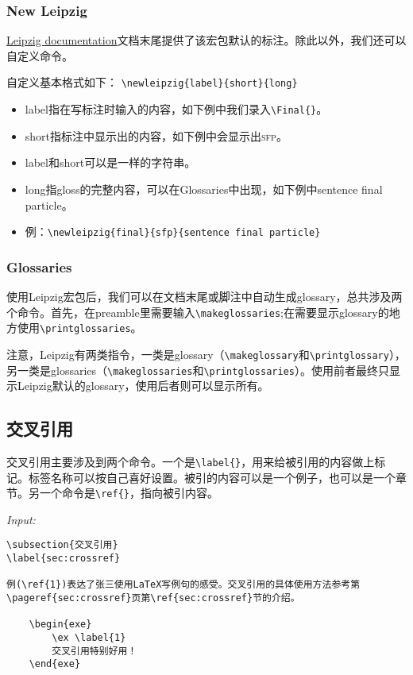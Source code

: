 \documentclass[a4paper,12pt]{article}
\begin{document}
\subsubsection{New Leipzig}

\href{http://ctan.cs.uu.nl/macros/latex/contrib/leipzig/leipzig.pdf}{Leipzig documentation}文档末尾提供了该宏包默认的标注。除此以外，我们还可以自定义命令。

\vspace{3mm}
自定义基本格式如下：
\verb|\newleipzig{label}{short}{long}|
\begin{itemize}
	\item label指在写标注时输入的内容，如下例中我们录入\verb|\Final{}|。
	\item short指标注中显示出的内容，如下例中会显示出\textsc{sfp}。
	\item label和short可以是一样的字符串。
	\item long指gloss的完整内容，可以在Glossaries中出现，如下例中sentence final particle。
	\item 例：\verb|\newleipzig{final}{sfp}{sentence final particle}|
\end{itemize}

\subsubsection{Glossaries}

使用Leipzig宏包后，我们可以在文档末尾或脚注中自动生成glossary，总共涉及两个命令。首先，在preamble里需要输入\verb|\makeglossaries|;在需要显示glossary的地方使用\verb|\printglossaries|。

注意，Leipzig有两类指令，一类是glossary（\verb|\makeglossary|和\verb|\printglossary|），另一类是glossaries（\verb|\makeglossaries|和\verb|\printglossaries|）。使用前者最终只显示Leipzig默认的glossary，使用后者则可以显示所有。



\subsection{交叉引用}
\label{sec:crossref}

交叉引用主要涉及到两个命令。一个是\verb|\label{}|，用来给被引用的内容做上标记。标签名称可以按自己喜好设置。被引的内容可以是一个例子，也可以是一个章节。另一个命令是\verb|\ref{}|，指向被引内容。

\vspace{3mm}
\textit{Input:}
\begin{Verbatim}
\subsection{交叉引用}
\label{sec:crossref}

例(\ref{1})表达了张三使用LaTeX写例句的感受。交叉引用的具体使用方法参考第\pageref{sec:crossref}页第\ref{sec:crossref}节的介绍。
	
	\begin{exe}
		\ex \label{1}
		交叉引用特别好用！
	\end{exe}
\end{Verbatim}
\end{document}
